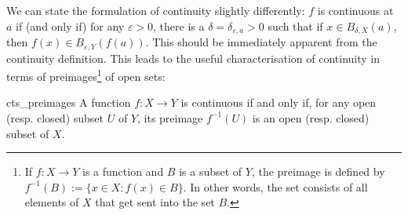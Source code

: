 We can state the formulation of continuity slightly differently: $f$ is continuous at $a$ if (and only if) for any $\varepsilon>0$, there is a \mbox{$\delta = \delta_{\varepsilon,a}>0$} such that if \mbox{$x\in B_{\delta, X}(a)$,} then \mbox{$f(x)\in B_{\varepsilon, Y}(f(a))$.} This should be immediately apparent from the continuity definition. This leads to the useful characterisation of continuity in terms of preimages\footnote{If $f: X \to Y$ is a function and $B$ is a subset of $Y$, the preimage is defined by $f^{-1}(B) := \{x\in X : f(x) \in B \}$. In other words, the set consists of all elements of $X$ that get sent into the set $B$.} of open sets:
\begin{bprop}{}{cts_preimages}
A function $f : X \to Y$ is continuous if and only if, for any open (resp. closed) subset $U$ of $Y$, its preimage $f^{-1}(U)$ is an open (resp. closed) subset of $X$.
\end{bprop}
